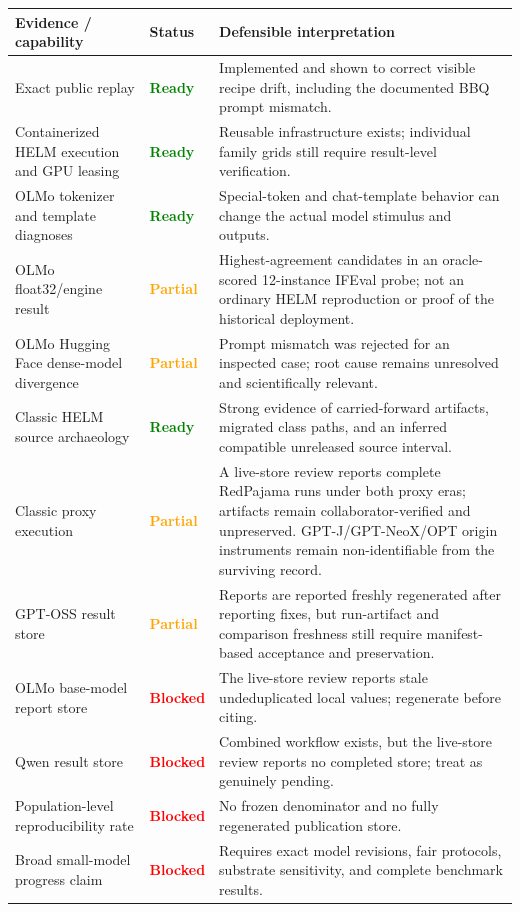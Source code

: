 \documentclass[11pt]{article}
\newcommand{\code}[1]{\texttt{\detokenize{#1}}}
\newcommand{\ready}{\textcolor{green}{\textbf{Ready}}}
\newcommand{\partstat}{\textcolor{orange}{\textbf{Partial}}}
\newcommand{\blocked}{\textcolor{red}{\textbf{Blocked}}}
\begin{document}
\begin{longtable}{@{}P{0.29\textwidth}P{0.13\textwidth}P{0.49\textwidth}@{}}
\toprule
Evidence / capability & Status & Defensible interpretation \\
\midrule
Exact public \code{run_spec.json} replay & \ready & Implemented and shown to correct visible recipe drift, including the documented BBQ prompt mismatch. \\
Containerized HELM execution and GPU leasing & \ready & Reusable infrastructure exists; individual family grids still require result-level verification. \\
OLMo tokenizer and template diagnoses & \ready & Special-token and chat-template behavior can change the actual model stimulus and outputs. \\
OLMo float32/engine result & \partstat & Highest-agreement candidates in an oracle-scored 12-instance IFEval probe; not an ordinary HELM reproduction or proof of the historical deployment. \\
OLMo Hugging Face dense-model divergence & \partstat & Prompt mismatch was rejected for an inspected case; root cause remains unresolved and scientifically relevant. \\
Classic HELM source archaeology & \ready & Strong evidence of carried-forward artifacts, migrated class paths, and an inferred compatible unreleased source interval. \\
Classic proxy execution & \partstat & A live-store review reports complete RedPajama runs under both proxy eras; artifacts remain collaborator-verified and unpreserved. GPT-J/GPT-NeoX/OPT origin instruments remain non-identifiable from the surviving record. \\
GPT-OSS result store & \partstat & Reports are reported freshly regenerated after reporting fixes, but run-artifact and comparison freshness still require manifest-based acceptance and preservation. \\
OLMo base-model report store & \blocked & The live-store review reports stale undeduplicated local values; regenerate before citing. \\
Qwen result store & \blocked & Combined workflow exists, but the live-store review reports no completed store; treat as genuinely pending. \\
Population-level reproducibility rate & \blocked & No frozen denominator and no fully regenerated publication store. \\
Broad small-model progress claim & \blocked & Requires exact model revisions, fair protocols, substrate sensitivity, and complete benchmark results. \\
\bottomrule
\end{longtable}
\end{document}

